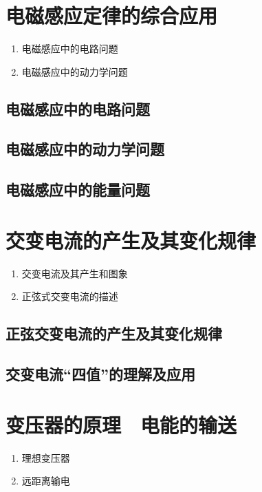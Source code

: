 \documentclass[cn,11pt, simple]{elegantbook}
\begin{document}
\chapter{电磁感应定律的综合应用}
\begin{enumerate}
   \item 电磁感应中的电路问题
   \item 电磁感应中的动力学问题
\end{enumerate}

\clearpage\section{电磁感应中的电路问题}

\clearpage\section{电磁感应中的动力学问题}

\clearpage\section{电磁感应中的能量问题}

\chapter{交变电流的产生及其变化规律}
\begin{enumerate}
   \item 交变电流及其产生和图象
   \item 正弦式交变电流的描述
\end{enumerate}

\clearpage\section{正弦交变电流的产生及其变化规律}

\clearpage\section{交变电流“四值”的理解及应用}

\chapter{变压器的原理　电能的输送}
\begin{enumerate}
   \item 理想变压器
   \item 远距离输电
\end{enumerate}
\end{document}
